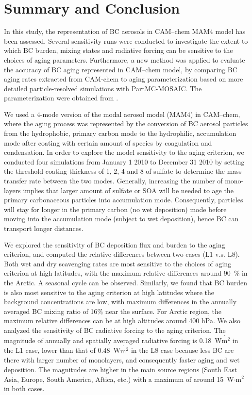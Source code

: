 \documentclass[12pt, fullpage]{uiucthesis2009}
\begin{document}
	
	\chapter{Summary and Conclusion}
		In this study, the representation of BC aerosols in CAM--chem MAM4 model has been assessed. Several sensitivity runs were conducted to investigate the extent to which BC burden, mixing states and radiative forcing can be sensitive to the choices of aging parameters. Furthermore, a new method was applied to evaluate the accuracy of BC aging represented in CAM--chem model, by comparing BC aging rates extracted from CAM-chem to aging parameterization based on more detailed particle-resolved simulations with PartMC-MOSAIC. The parameterization were obtained from \cite{Fierce2016}. 
		
		We used a 4-mode version of the modal aerosol model (MAM4) in CAM--chem, where the aging process was represented by the conversion of BC aerosol particles from the hydrophobic, primary carbon mode to the hydrophilic, accumulation mode after coating with certain amount of species by coagulation and condensation. In order to explore the model sensitivity to the aging criterion, we conducted four simulations from January 1 2010 to December 31 2010 by setting the threshold coating thickness of 1, 2, 4 and 8 of sulfate to determine the mass transfer rate between the two modes. Generally, increasing the number of mono-layers implies that larger amount of sulfate or SOA will be needed to age the primary carbonaceous particles into accumulation mode. Consequently, particles will stay for longer in the primary carbon (no wet deposition) mode before moving into the accumulation mode (subject to wet deposition), hence BC can transport longer distances. 
		
		We explored the sensitivity of BC deposition flux and burden to the aging criterion, and computed the relative differences between two cases (L1 v.s. L8). Both wet and dry scavenging rates are most sensitive to the choices of aging criterion at high latitudes, with the maximum relative differences around 90~$\%$ in the Arctic. A seasonal cycle can be observed. Similarly, we found that BC burden is also most sensitive to the aging criterion at high latitudes where the background concentrations are low, with maximum differences in the annually averaged BC mixing ratio of 16$\%$ near the surface. For Arctic region, the maximum relative differences can be at high altitudes around 400 hPa. We also analyzed the sensitivity of BC radiative forcing to the aging criterion. The magnitude of annually and spatially averaged radiative forcing is 0.18~W$\dot{\text{m}^2}$ in the L1 case, lower than that of 0.48~W$\dot{\text{m}^2}$ in the L8 case because less BC are there with larger number of monolayers, and consequently faster aging and wet deposition. The magnitudes are higher in the main source regions (South East Asia, Europe, South America, Aftica, etc.) with a maximum of around 15~W$\cdot{\text{m}^2}$ in both cases.  
		
\end{document}
